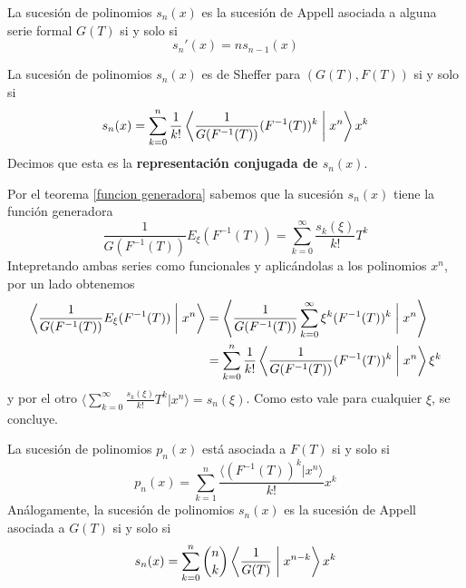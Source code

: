 \begin{corolario}
    La sucesión de polinomios $s_n(x)$ es la sucesión de Appell asociada a alguna serie formal $G(T)$ si y solo si
    \begin{equation*}
        s_n'(x) = ns_{n-1}(x)
    \end{equation*}
\end{corolario}

\begin{teorema}\label{representacion conjugada}
    La sucesión de polinomios $s_n(x)$ es de Sheffer para $(G(T), F(T))$ si y solo si
    \begin{equation*}
        s_n(x) = \sum_{k=0}^n \frac{1}{k!} \left\langle \frac{1}{G(F^{-1}(T))}(F^{-1}(T))^k \biggm| x^n \right\rangle x^k
    \end{equation*}
    Decimos que esta es la \textbf{representación conjugada de $s_n(x)$}.
\end{teorema}

\begin{demo}
    Por el teorema \ref{funcion generadora} sabemos que la sucesión $s_n(x)$ tiene la función generadora
    \begin{equation*}
        \frac{1}{G(F^{-1}(T))}E_{\xi} (F^{-1}(T)) = \sum_{k=0}^\infty \frac{s_k(\xi)}{k!}T^k
    \end{equation*}
    Intepretando ambas series como funcionales y aplicándolas a los polinomios $x^n$, por un lado obtenemos
\begin{align*}
    \left\langle \frac{1}{G(F^{-1}(T))}E_{\xi} (F^{-1}(T)) \biggm| x^n \right\rangle & = \left\langle \frac{1}{G(F^{-1}(T))} \sum_{k=0}^\infty \xi^k (F^{-1}(T))^k \biggm| x^n \right\rangle\\
    & = \sum_{k=0}^n \frac{1}{k!} \left\langle \frac{1}{G(F^{-1}(T))}(F^{-1}(T))^k \biggm| x^n \right\rangle \xi^k
\end{align*}
y por el otro $\displaystyle \langle \sum_{k=0}^\infty \frac{s_k(\xi)}{k!}T^k | x^n \rangle = s_n(\xi)$. Como esto vale para cualquier $\xi$, se concluye.
\end{demo}

\begin{corolario}
    La sucesión de polinomios $p_n(x)$ está asociada a $F(T)$ si y solo si 
    \begin{equation*}
        p_n(x) = \sum_{k=1}^n \frac{\langle \left(F^{-1}(T)\right)^k | x^n \rangle}{k!} x^k
    \end{equation*}
    Análogamente, la sucesión de polinomios $s_n(x)$ es la sucesión de Appell asociada a $G(T)$ si y solo si 
    \begin{equation*}
        s_n(x) = \sum_{k=0}^n \binom{n}{k} \left\langle \frac{1}{G(T)} \biggm| x^{n-k} \right\rangle x^k
    \end{equation*}
\end{corolario}


